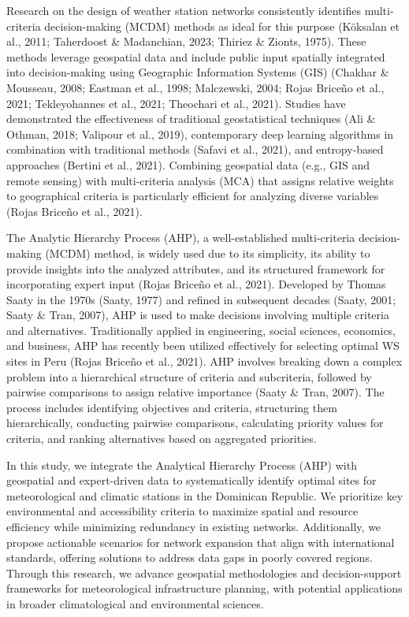 \documentclass[spanish]{article}
\begin{document}
Research on the design of weather station networks consistently
identifies multi-criteria decision-making (MCDM) methods as ideal for
this purpose (Köksalan et al., 2011; Taherdoost \& Madanchian, 2023;
Thiriez \& Zionts, 1975). These methods leverage geospatial data and
include public input spatially integrated into decision-making using
Geographic Information Systems (GIS) (Chakhar \& Mousseau, 2008; Eastman
et al., 1998; Malczewski, 2004; Rojas Briceño et al., 2021;
Tekleyohannes et al., 2021; Theochari et al., 2021). Studies have
demonstrated the effectiveness of traditional geostatistical techniques
(Ali \& Othman, 2018; Valipour et al., 2019), contemporary deep learning
algorithms in combination with traditional methods (Safavi et al.,
2021), and entropy-based approaches (Bertini et al., 2021). Combining
geospatial data (e.g., GIS and remote sensing) with multi-criteria
analysis (MCA) that assigns relative weights to geographical criteria is
particularly efficient for analyzing diverse variables (Rojas Briceño et
al., 2021).

The Analytic Hierarchy Process (AHP), a well-established multi-criteria
decision-making (MCDM) method, is widely used due to its simplicity, its
ability to provide insights into the analyzed attributes, and its
structured framework for incorporating expert input (Rojas Briceño et
al., 2021). Developed by Thomas Saaty in the 1970s (Saaty, 1977) and
refined in subsequent decades (Saaty, 2001; Saaty \& Tran, 2007), AHP is
used to make decisions involving multiple criteria and alternatives.
Traditionally applied in engineering, social sciences, economics, and
business, AHP has recently been utilized effectively for selecting
optimal WS sites in Peru (Rojas Briceño et al., 2021). AHP involves
breaking down a complex problem into a hierarchical structure of
criteria and subcriteria, followed by pairwise comparisons to assign
relative importance (Saaty \& Tran, 2007). The process includes
identifying objectives and criteria, structuring them hierarchically,
conducting pairwise comparisons, calculating priority values for
criteria, and ranking alternatives based on aggregated priorities.

In this study, we integrate the Analytical Hierarchy Process (AHP) with
geospatial and expert-driven data to systematically identify optimal
sites for meteorological and climatic stations in the Dominican
Republic. We prioritize key environmental and accessibility criteria to
maximize spatial and resource efficiency while minimizing redundancy in
existing networks. Additionally, we propose actionable scenarios for
network expansion that align with international standards, offering
solutions to address data gaps in poorly covered regions. Through this
research, we advance geospatial methodologies and decision-support
frameworks for meteorological infrastructure planning, with potential
applications in broader climatological and environmental sciences.
\end{document}
